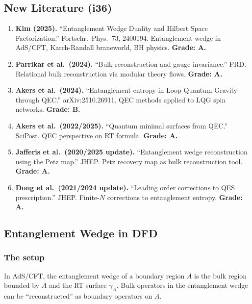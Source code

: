 \documentclass[11pt,a4paper]{article}
\begin{document}
\subsection{New Literature (i36)}

\begin{enumerate}
\item \textbf{Kim (2025).} ``Entanglement Wedge Duality and Hilbert Space Factorization.'' Fortschr.\ Phys.\ 73, 2400194. Entanglement wedge in AdS/CFT, Karch-Randall braneworld, BH physics. \textbf{Grade: A.}

\item \textbf{Parrikar et al.\ (2024).} ``Bulk reconstruction and gauge invariance.'' PRD. Relational bulk reconstruction via modular theory flows. \textbf{Grade: A.}

\item \textbf{Akers et al.\ (2024).} ``Entanglement entropy in Loop Quantum Gravity through QEC.'' arXiv:2510.26911. QEC methods applied to LQG spin networks. \textbf{Grade: B.}

\item \textbf{Akers et al.\ (2022/2025).} ``Quantum minimal surfaces from QEC.'' SciPost. QEC perspective on RT formula. \textbf{Grade: A.}

\item \textbf{Jafferis et al.\ (2020/2025 update).} ``Entanglement wedge reconstruction using the Petz map.'' JHEP. Petz recovery map as bulk reconstruction tool. \textbf{Grade: A.}

\item \textbf{Dong et al.\ (2021/2024 update).} ``Leading order corrections to QES prescription.'' JHEP. Finite-$N$ corrections to entanglement entropy. \textbf{Grade: A.}
\end{enumerate}

\subsection{Entanglement Wedge in DFD}

\subsubsection{The setup}

In AdS/CFT, the entanglement wedge of a boundary region $A$ is the bulk region bounded by $A$ and the RT surface $\gamma_A$. Bulk operators in the entanglement wedge can be ``reconstructed'' as boundary operators on $A$.
\end{document}

